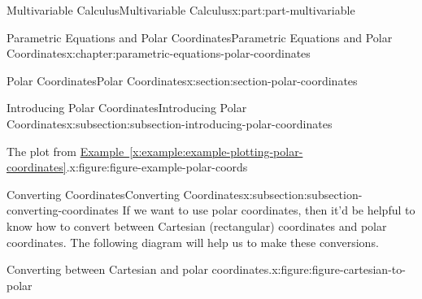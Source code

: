 \documentclass[twoside,10pt,]{tufte-book}
\newcommand{\xreffont}{\relax}
\numberwithin{equation}{part}
\begin{document}
\begin{partptx}{Multivariable Calculus}{}{Multivariable Calculus}{}{}{x:part:part-multivariable}
\begin{chapterptx}{Parametric Equations and Polar Coordinates}{}{Parametric Equations and Polar Coordinates}{}{}{x:chapter:parametric-equations-polar-coordinates}
\begin{sectionptx}{Polar Coordinates}{}{Polar Coordinates}{}{}{x:section:section-polar-coordinates}
\begin{subsectionptx}{Introducing Polar Coordinates}{}{Introducing Polar Coordinates}{}{}{x:subsection:subsection-introducing-polar-coordinates}
\begin{figureptx}{The plot from \hyperref[x:example:example-plotting-polar-coordinates]{Example~{\xreffont\ref{x:example:example-plotting-polar-coordinates}}}.}{x:figure:figure-example-polar-coords}{}
\begin{image}{0}{1}{0}
{
}%
\end{image}%
\tcblower
\end{figureptx}%
\end{subsectionptx}
%
%
\typeout{************************************************}
\typeout{************************************************}
%
\begin{subsectionptx}{Converting Coordinates}{}{Converting Coordinates}{}{}{x:subsection:subsection-converting-coordinates}
If we want to use polar coordinates, then it'd be helpful to know how to convert between Cartesian (rectangular) coordinates and polar coordinates. The following diagram will help us to make these conversions.%
\begin{figureptx}{Converting between Cartesian and polar coordinates.}{x:figure:figure-cartesian-to-polar}{}%
\begin{image}{0}{1}{0}%
\end{image}
\end{figureptx}
\end{subsectionptx}
\end{sectionptx}
\end{chapterptx}
\end{partptx}
\end{document}
